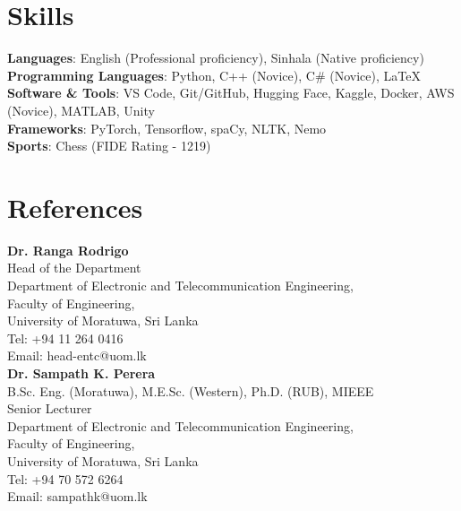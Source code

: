 \documentclass[letterpaper,11pt]{article}
\begin{document}
\section{Skills}
 \begin{itemize}[leftmargin=0.15in, label={}]
    {\small
    \small{\item{
    \vspace{5pt}
     \textbf{Languages}{: English (Professional proficiency), Sinhala (Native proficiency)} \\
    \vspace{5pt}
     \textbf{Programming Languages}{: Python, C++ (Novice), C\# (Novice), \LaTeX} \\
    \vspace{5pt}
     \textbf{Software \& Tools}{: VS Code, Git/GitHub, Hugging Face, Kaggle, Docker, AWS (Novice), MATLAB, Unity}\\
     \vspace{5pt}
     \textbf{Frameworks}{: PyTorch, Tensorflow, spaCy, NLTK, Nemo}\\
    \vspace{5pt}
     \textbf{Sports}{: Chess (FIDE Rating - 1219)}
     }
    }}
 \end{itemize}

\section{References}
\vspace{-12pt}
\begin{multicols}{2} %
    {\scriptsize 
  \textbf{Dr. Ranga Rodrigo} \\
      Head of the Department\\
      Department of Electronic and Telecommunication Engineering,\\
      Faculty of Engineering,\\
      University of Moratuwa, Sri Lanka\\
      Tel: +94 11 264 0416\\
      Email: head-entc@uom.lk\\
    \columnbreak
    \textbf{Dr. Sampath K. Perera} \\
    B.Sc. Eng. (Moratuwa), M.E.Sc. (Western), Ph.D. (RUB), MIEEE\\
      Senior Lecturer\\
      Department of Electronic and Telecommunication Engineering,\\
      Faculty of Engineering,\\
      University of Moratuwa, Sri Lanka\\
      Tel: +94 70 572 6264\\
      Email: sampathk@uom.lk\\
      }

\end{multicols}
\end{document}
